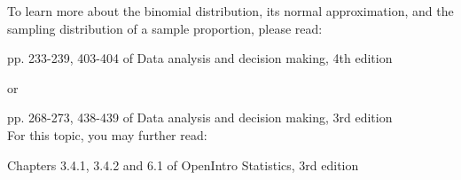 \documentclass[11pt]{article}
\begin{document}
%
%
%
%
%
%
%
%


To learn more about the binomial distribution, its  normal approximation, and the sampling distribution of a sample proportion, please read:

pp. 233-239, 403-404 of Data analysis and decision making, 4th edition

or 

pp. 268-273, 438-439 of  Data analysis and decision making, 3rd edition\\

For this topic, you may further read:

Chapters 3.4.1, 3.4.2 and 6.1 of OpenIntro Statistics, 3rd edition
\end{document}
